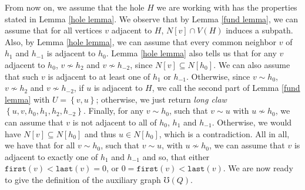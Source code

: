 \documentclass{article}
\theoremstyle{definition}
\begin{document}
    From now on, 
    we assume that the hole $H$
    we are working with
    has the properties
    stated in Lemma \ref{hole lemma}.
    We observe that by
    Lemma \ref{fund lemma},
    we can assume that for
    all vertices 
    $v$ adjacent to $H$, 
    $N\left[v\right] \cap V\left(H\right)$
    induces a subpath.
    Also, by Lemma \ref{hole lemma},
    we can assume that 
    every common neighbor $v$ 
    of $h_1$ and $h_{-1}$ 
    is adjacent to $h_0$.
    Lemma \ref{hole lemma}
    also tells us
    that for any $v$ adjacent
    to $h_0$, $v \not\sim h_2$ 
    and $v \not\sim h_{-2}$,
    since $N\left[v\right] \subseteq N\left[h_0\right]$.
    We can also assume
    that such $v$ is adjacent to at
    least one of $h_1$ or $h_{-1}$.
    Otherwise, since $v \sim h_0$,
    $v \not\sim h_2$ and $v \not \sim h_{-2}$,
    if $u$ is adjacent to $H$,
    we call the second part of 
    Lemma \ref{fund lemma}
    with $U = \left\{v, u\right\}$;
    otherwise, we just
    return \emph{long claw}
    $\left\{u, v, h_0, h_1, h_{2}, h_{-2}\right\}$.
    Finally, for any $v \sim h_0$,
    such that $v \sim u$ with
    $u \not\sim h_0$,
    we can assume that
    $v$ is not 
    adjacent to all
    of $h_0$, $h_1$ and $h_{-1}$. 
    Otherwise, we
    would have $N\left[v\right] \subseteq N\left[h_0\right]$ 
    and thus $u \in N\left[h_0\right]$,
    which is a contradiction.
    All in all, we have
    that for all $v \sim h_0$,
    such that $v \sim u$,
    with $u \not\sim h_0$,
    we can assume that
    $v$ is adjacent to
    exactly one of $h_1$
    and $h_{-1}$ and so,
    that either $\texttt{first}\left(v\right)
    < \texttt{last}\left(v\right) = 0$,
    or $0 = \texttt{first}\left(v\right) < \texttt{last}\left(v\right)$.
    We are now ready to 
    give the definition of 
    the auxiliary graph $\mho\left(Q\right)$.
\end{document}
